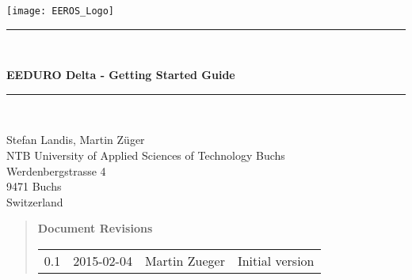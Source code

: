 




\begin{titlepage}
	\begin{center}
		\texttt{[image: EEROS\_Logo]}
	\end{center}
	\vspace{4.5cm}
	{
		\selectfont
	
		\rule{\linewidth}{0.5mm} \\[0cm]
	
		\begin{center}
			{\huge \bfseries EEDURO Delta - Getting Started Guide} \\
		\end{center}
		
		\rule{\linewidth}{0.5mm} \\[0.4cm]
		
		\vspace{1.5cm}
		
		Stefan Landis, Martin Züger \\
		
		
		NTB University of Applied Sciences of Technology Buchs\\
		Werdenbergstrasse 4\\
		9471 Buchs\\
		Switzerland\\
		\vfill
	}
\end{titlepage}
\clearpage

\begin{abstract}

\begin{large}
 \textbf{Document Revisions}
\end{large}

\begin{tabular}{lllp{10cm}}
0.1 & 2015-02-04 & Martin Zueger & Initial version \\
\end{tabular} 

\end{abstract}
\setcounter{page}{1}
\setcounter{tocdepth}{2}
\tableofcontents

